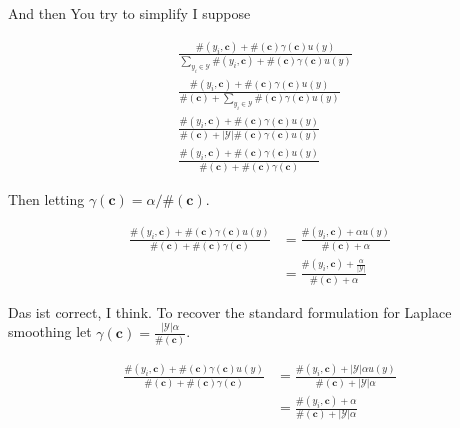 \documentclass{article}
\newcommand{\context}{\boldsymbol{c}}
\begin{document}
			And then You try to simplify I suppose
			
			\begin{align}
				&\frac{\#(y_i, \context) +\#(\context)\gamma(\context)u(y)}{\sum_{y_i\in\mathcal{Y}} \#(y_i, \context) +\#(\context)\gamma(\context)u(y)}\\
				&\frac{\#(y_i, \context) +\#(\context)\gamma(\context)u(y)}{ \#(\context) + \sum_{y_i\in\mathcal{Y}} \#(\context)\gamma(\context)u(y)}\\
				&\frac{\#(y_i, \context) +\#(\context)\gamma(\context)u(y)}{ \#(\context) + |\mathcal{Y}|\#(\context)\gamma(\context)u(y)}\\
				&\frac{\#(y_i, \context) +\#(\context)\gamma(\context)u(y)}{ \#(\context) + \#(\context)\gamma(\context)}	
			\end{align}
	
			Then letting $\gamma(\context) = \alpha/\#(\context)$.
		
			\begin{align}
				\frac{\#(y_i, \context) +\#(\context)\gamma(\context)u(y)}{ \#(\context) + \#(\context)\gamma(\context)}	&= \frac{\#(y_i, \context) +\alpha u(y)}{ \#(\context) + \alpha}\\
				&= \frac{\#(y_i, \context) + \frac{\alpha}{|\mathcal{Y}|}}{ \#(\context) + \alpha}
			\end{align}
		
			Das ist correct, I think. To recover the standard formulation for Laplace smoothing let $\gamma(\context) = \frac{|\mathcal{Y}|\alpha}{\#(\context)}$.
		
			\begin{align}
				\frac{\#(y_i, \context) +\#(\context)\gamma(\context)u(y)}{ \#(\context) + \#(\context)\gamma(\context)}	&= \frac{\#(y_i, \context) +|\mathcal{Y}|\alpha u(y)}{ \#(\context) + |\mathcal{Y}|\alpha}\\
				&= \frac{\#(y_i, \context) + \alpha}{ \#(\context) + |\mathcal{Y}|\alpha}
			\end{align}
		
		
		
		
		
		
		
		
		
		
		
		
		
		
		
		
\end{document}
